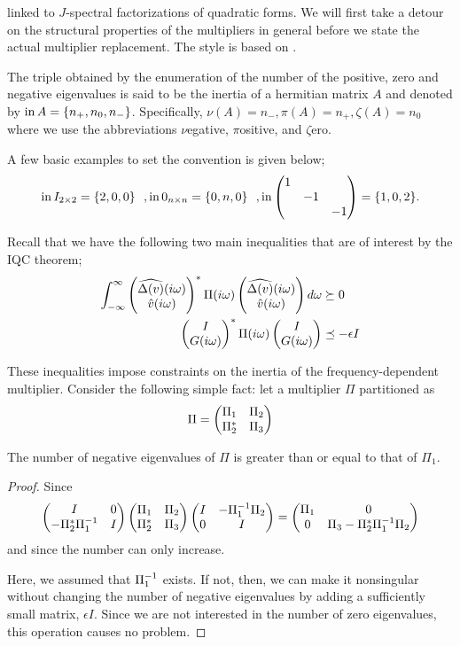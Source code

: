 linked to $J$-spectral factorizations of quadratic forms. We will first take a detour on the structural properties 
of the multipliers in general before we state the actual multiplier replacement. The style is based on \cite{helmersson2}.
\begin{define}[Inertia] The triple obtained by the enumeration of the number of the positive, zero and negative 
eigenvalues is said to be the inertia of a hermitian matrix $A$ and denoted by $\operatorname{in} A = \{n_+,n_0,n_-\}$. 
Specifically, $\nu(A) = n_-, \pi(A) = n_+, \zeta(A) = n_0$ where we use the abbreviations $\nu$egative, $\pi$ositive, and $\zeta$ero.
\end{define}
A few basic examples to set the convention is given below;
\[
\operatorname{in} I_{2\times 2} = \{2,0,0\}\ \ , \operatorname{in} 0_{n\times n} = \{0,n,0\} \ \ ,\operatorname{in} \begin{pmatrix}1 &&\\&-1&\\&&-1\end{pmatrix} = \{1,0,2\}.
\]


Recall that we have the following two main inequalities that are of interest by the IQC theorem;
\begin{align}\label{eq:interlude1}
\int_{-\infty}^\infty{\begin{pmatrix}\widehat{\Delta(v)}(i\omega)\\\hat{v}(i\omega)\end{pmatrix}^*\Pi(i\omega)\begin{pmatrix}\widehat{\Delta(v)}(i\omega)\\\hat{v}(i\omega)\end{pmatrix}d\omega} &\succeq 0\\
\label{eq:interlude2}
\begin{pmatrix}I\\G(i\omega)\end{pmatrix}^*\Pi(i\omega)\begin{pmatrix}I\\G(i\omega)\end{pmatrix} &\preceq -\epsilon I
\end{align}

These inequalities impose constraints on the inertia of the frequency-dependent multiplier. Consider the following 
simple fact: let a multiplier $\Pi$ partitioned as
\begin{equation}
\Pi = \begin{pmatrix}\Pi_1&\Pi_2\\\Pi_2^* &\Pi_3\end{pmatrix}
\label{eq:Pipartition}
\end{equation}


\begin{lem}\label{lem:negnag}
The number of negative eigenvalues of $\Pi$ is greater than or equal to that of $\Pi_1$.
\end{lem}


\begin{proof}
Since
\[
\begin{pmatrix}I&0\\-\Pi_2^*\Pi_1^{-1} &I\end{pmatrix}\begin{pmatrix}\Pi_1&\Pi_2\\ \Pi_2^* &\Pi_3\end{pmatrix}
\begin{pmatrix}I&-\Pi_1^{-1}\Pi_2\\0&I\end{pmatrix} = \begin{pmatrix}\Pi_1&0\\0 &\Pi_3-\Pi_2^*\Pi_1^{-1}\Pi_2\end{pmatrix}
\]
and since the number can only increase. 

Here, we assumed that $\Pi_1^{-1}$ exists. If not, then, we can make it nonsingular without changing the number of 
negative eigenvalues by adding a sufficiently small matrix, $\epsilon I$. Since we are not interested in the number 
of zero eigenvalues, this operation causes no problem.
\end{proof}

